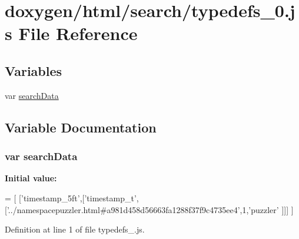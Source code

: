 \hypertarget{a00103}{}\section{doxygen/html/search/typedefs\+\_\+0.js File Reference}
\label{a00103}
\subsection*{Variables}
\begin{DoxyCompactItemize}
\item 
var \hyperlink{a00103_ad01a7523f103d6242ef9b0451861231e}{search\+Data}
\end{DoxyCompactItemize}


\subsection{Variable Documentation}
\hypertarget{a00103_ad01a7523f103d6242ef9b0451861231e}{}
\subsubsection[{search\+Data}]{\setlength{\rightskip}{0pt plus 5cm}var search\+Data}\label{a00103_ad01a7523f103d6242ef9b0451861231e}
{\bfseries Initial value\+:}
\begin{DoxyCode}
=
[
  [\textcolor{stringliteral}{'timestamp\_5ft'},[\textcolor{stringliteral}{'timestamp\_t'},[\textcolor{stringliteral}{'../namespacepuzzler.html#a981d458d56663fa1288f37f9c4735ee4'},1,\textcolor{stringliteral}{'puzzler'}
      ]]]
]
\end{DoxyCode}


Definition at line 1 of file typedefs\+\_.\+js.

